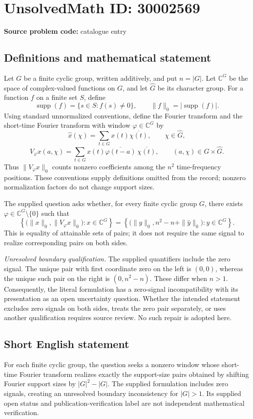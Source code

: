 \documentclass[11pt]{article}
\newcommand{\C}{\mathbb{C}}
\begin{document}
\section*{UnsolvedMath ID: 30002569}
\textbf{Source problem code:} catalogue entry
\subsection{Definitions and mathematical statement}
Let \(G\) be a finite cyclic group, written additively, and put \(n=|G|\). Let \(\C^G\) be the space of complex-valued functions on \(G\), and let \(\widehat G\) be its character group. For a function \(f\) on a finite set \(S\), define
\[
\operatorname{supp}(f)=\{s\in S:f(s)\ne0\},\qquad \|f\|_0=|\operatorname{supp}(f)|.
\]
Using standard unnormalized conventions, define the Fourier transform and the short-time Fourier transform with window \(\varphi\in\C^G\) by
\[
\widehat x(\chi)=\sum_{t\in G}x(t)\overline{\chi(t)},\qquad \chi\in\widehat G,
\]
\[
V_\varphi x(a,\chi)=\sum_{t\in G}x(t)\overline{\varphi(t-a)}\,\overline{\chi(t)},\qquad (a,\chi)\in G\times\widehat G.
\]
Thus \(\|V_\varphi x\|_0\) counts nonzero coefficients among the \(n^2\) time-frequency positions. These conventions supply definitions omitted from the record; nonzero normalization factors do not change support sizes.

The supplied question asks whether, for every finite cyclic group \(G\), there exists \(\varphi\in\C^G\setminus\{0\}\) such that
\[
\left\{\bigl(\|x\|_0,\|V_\varphi x\|_0\bigr):x\in\C^G\right\}
=
\left\{\bigl(\|y\|_0,n^2-n+\|\widehat y\|_0\bigr):y\in\C^G\right\}.
\]
This is equality of attainable sets of pairs; it does not require the same signal to realize corresponding pairs on both sides.

\textit{Unresolved boundary qualification.} The supplied quantifiers include the zero signal. The unique pair with first coordinate zero on the left is \((0,0)\), whereas the unique such pair on the right is \((0,n^2-n)\). These differ when \(n>1\). Consequently, the literal formulation has a zero-signal incompatibility with its presentation as an open uncertainty question. Whether the intended statement excludes zero signals on both sides, treats the zero pair separately, or uses another qualification requires source review. No such repair is adopted here.
\subsection{Short English statement}
For each finite cyclic group, the question seeks a nonzero window whose short-time Fourier transform realizes exactly the support-size pairs obtained by shifting Fourier support sizes by \(|G|^2-|G|\). The supplied formulation includes zero signals, creating an unresolved boundary inconsistency for \(|G|>1\). Its supplied open status and publication-verification label are not independent mathematical verification.
\end{document}
